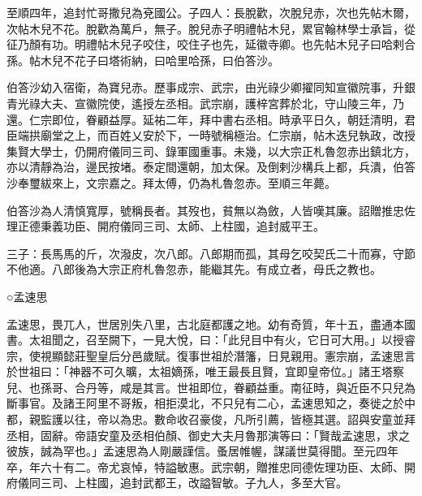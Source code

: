 \begin{pinyinscope}
 至順四年，追封忙哥撒兒為兗國公。子四人：長脫歡，次脫兒赤，次也先帖木爾，次帖木兒不花。脫歡為萬戶，無子。脫兒赤子明禮帖木兒，累官翰林學士承旨，從征乃顏有功。明禮帖木兒子咬住，咬住子也先，延徽寺卿。也先帖木兒子曰哈剌合孫。帖木兒不花子曰塔術納，曰哈里哈孫，曰伯答沙。



 伯答沙幼入宿衛，為寶兒赤。歷事成宗、武宗，由光祿少卿擢同知宣徽院事，升銀青光祿大夫、宣徽院使，遙授左丞相。武宗崩，護梓宮葬於北，守山陵三年，乃還。仁宗即位，眷顧益厚。延祐二年，拜中書右丞相。時承平日久，朝廷清明，君臣端拱廟堂之上，而百姓乂安於下，一時號稱極治。仁宗崩，帖木迭兒執政，改授集賢大學士，仍開府儀同三司、錄軍國重事。未幾，以大宗正札魯忽赤出鎮北方，亦以清靜為治，邊民按堵。泰定間還朝，加太保。及倒剌沙構兵上都，兵潰，伯答沙奉璽紱來上，文宗嘉之。拜太傅，仍為札魯忽赤。至順三年薨。



 伯答沙為人清慎寬厚，號稱長者。其歿也，貧無以為斂，人皆嘆其廉。詔贈推忠佐理正德秉義功臣、開府儀同三司、太師、上柱國，追封威平王。



 三子：長馬馬的斤，次潑皮，次八郎。八郎期而孤，其母乞咬契氏二十而寡，守節不他適。八郎後為大宗正府札魯忽赤，能繼其先。有成立者，母氏之教也。



 ○孟速思



 孟速思，畏兀人，世居別失八里，古北庭都護之地。幼有奇質，年十五，盡通本國書。太祖聞之，召至闕下，一見大悅，曰：「此兒目中有火，它日可大用。」以授睿宗，使視顯懿莊聖皇后分邑歲賦。復事世祖於潛籓，日見親用。憲宗崩，孟速思言於世祖曰：「神器不可久曠，太祖嫡孫，唯王最長且賢，宜即皇帝位。」諸王塔察兒、也孫哥、合丹等，咸是其言。世祖即位，眷顧益重。南征時，與近臣不只兒為斷事官。及諸王阿里不哥叛，相拒漠北，不只兒有二心，孟速思知之，奏徙之於中都，親監護以往，帝以為忠。數命收召豪俊，凡所引薦，皆極其選。詔與安童並拜丞相，固辭。帝語安童及丞相伯顏、御史大夫月魯那演等曰：「賢哉孟速思，求之彼族，誠為罕也。」孟速思為人剛嚴謹信。蚤居帷幄，謀議世莫得聞。至元四年卒，年六十有二。帝尤哀悼，特謚敏惠。武宗朝，贈推忠同德佐理功臣、太師、開府儀同三司、上柱國，追封武都王，改謚智敏。子九人，多至大官。



\end{pinyinscope}